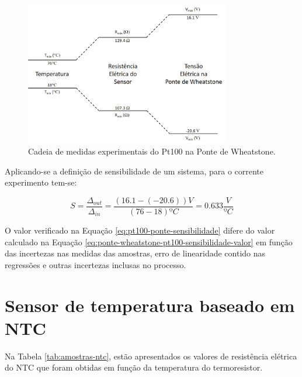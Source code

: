 \documentclass[a4paper]{instrumentacao}
\begin{document}
\begin{figure}[H]
\center
\includegraphics[width=0.8\textwidth]{cadeia_medidas_pt100_ponte.jpg}
\caption{Cadeia de medidas experimentais do Pt100 na Ponte de Wheatstone.}
\label{fig:pt100-cadeia-medidas-ponte}
\end{figure}

Aplicando-se a definição de sensibilidade de um sistema, para o corrente experimento tem-se:

\begin{equation}
	S=\frac{\Delta_{out}}{\Delta_{in}}=\frac{(16.1-(-20.6))V}{(76-18) ºC}=0.633 \frac{V}{ºC}
	\label{eq:pt100-ponte-sensibilidade}
\end{equation}

O valor verificado na Equação \ref{eq:pt100-ponte-sensibilidade} difere do valor calculado na Equação \ref{eq:ponte-wheatstone-pt100-sensibilidade-valor} em função das incertezas nas medidas das amostras, erro de linearidade contido nas regressões e outras incertezas inclusas no processo.


\section{Sensor de temperatura baseado em NTC}

Na Tabela \ref{tab:amostras-ntc}, estão apresentados os valores de resistência elétrica do NTC que foram obtidas em função da temperatura do termoresistor.
\end{document}
